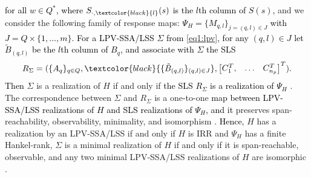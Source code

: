 \documentclass[journal,twoside,web]{ieeecolor}
\begin{document}
  \textcolor{black}{
  for all 
  $w \in Q^{*}$, 
  where $S_{\cdot,\textcolor{black}{l}}(s)$ is the \textcolor{black}{$l$}th column of $S(s)$,}
  and we consider the following family of response maps:
  \textcolor{black}{$\Psi_H = \{M_{q,l}\}_{j=(q,l) \in J}$ with $J=Q \times \{1,\ldots,m\}$.
   For a LPV-SSA/LSS $\Sigma$ from \eqref{eq1:lpv}, for any $(q,l) \in J$
   let $\tilde{B}_{(q,l)}$ be the $l$th column of $B_q$, and 
   associate with $\Sigma$ the SLS
  }
  \[ 
  \begin{split}
  &R_{\Sigma}=(\{A_q\}_{q \in Q},\textcolor{black}{\{\tilde{B}_{(q,l)}\}_{(q,l) \in J}},\begin{bmatrix} C_1^T, & \ldots & C_{n_p}^T \end{bmatrix}^T). \\
  \end{split}
  \]
  \textcolor{black}{Then} $\Sigma$ is a realization of $H$ if and only if \textcolor{black}{the SLS $R_{\Sigma}$ is a realization of $\Psi_H$} \cite{Petreczky2016}. The correspondence between $\Sigma$ and $R_{\Sigma}$ is a one-to-one \textcolor{black}{map between LPV-SSA/LSS realizations of $H$ and SLS realizations of $\Psi_H$, and it} preserves span-reachability, observability, minimality, and isomorphism \cite{Petreczky2016}.
  \textcolor{black}{Hence,} $H$ has a realization by an LPV-SSA/LSS if and only if $H$ is IRR and $\Psi_H$ has a  finite Hankel-rank, $\Sigma$ is a minimal realization of $H$ if and only if it is span-reachable, observable, and any two minimal LPV-SSA/LSS realizations of $H$ are isomorphic \cite{Petreczky2016}. 
\end{document}
